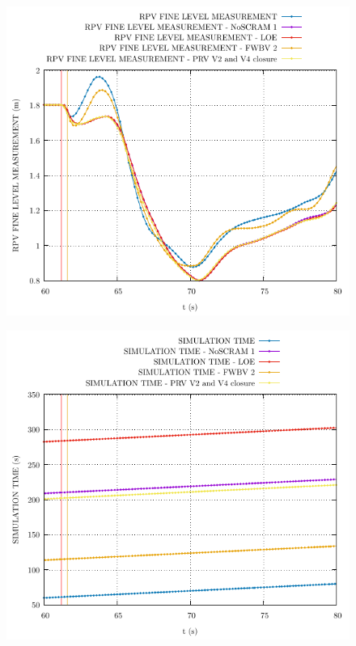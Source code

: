 \documentclass{article}
\begin{document}
\begin{multicols}{2}
\begin{figure}[H]
\includegraphics[width=\linewidth]{./graphs/RPV FINE LEVEL MEASUREMENT.pdf}
\end{figure}
\begin{figure}[H]
\centering
\includegraphics[width=\linewidth]{./graphs/SIMULATION TIME.pdf}
\end{figure}
\begin{figure}[H]
\centering

\end{figure}
\end{multicols}
\end{document}

